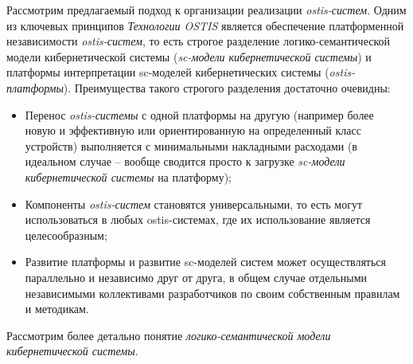 Рассмотрим предлагаемый подход к организации реализации \textit{ostis-систем}. Одним из ключевых принципов \textit{Технологии OSTIS} является обеспечение платформенной независимости \textit{ostis-систем}, то есть строгое разделение логико-семантической модели кибернетической системы (\textit{sc-модели кибернетической системы}) и платформы интерпретации sc-моделей кибернетических системы (\textit{ostis-платформы}). Преимущества такого строгого разделения достаточно очевидны:
\begin{itemize}
	\item Перенос \textit{ostis-системы} с одной платформы на другую (например более новую и эффективную или ориентированную на определенный класс устройств) выполняется с минимальными накладными расходами (в идеальном случае -- вообще сводится просто к загрузке \textit{sc-модели кибернетической системы} на платформу);
	\item Компоненты \textit{ostis-систем} становятся универсальными, то есть могут использоваться в любых ostis-системах, где их использование является целесообразным;
	\item Развитие платформы и развитие sc-моделей систем может осуществляться параллельно и независимо друг от друга, в общем случае отдельными независимыми коллективами разработчиков по своим собственным правилам и методикам.
\end{itemize}

Рассмотрим более детально понятие \textit{логико-семантической модели кибернетической системы}.


